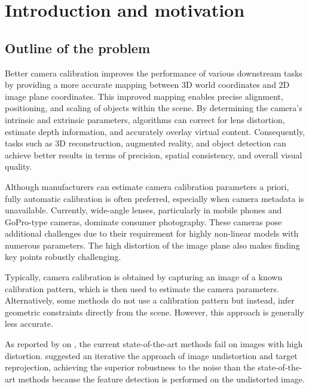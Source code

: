 \chapter{Introduction and motivation}\label{cha:introduction_and_motivation}

\section{Outline of the problem}\label{sec:outline_of_the_problem}

Better camera calibration improves the performance of various downstream tasks
by providing a more accurate mapping between 3D world coordinates and 2D image
plane coordinates. This improved mapping enables precise alignment, positioning,
and scaling of objects within the scene. By determining the camera's intrinsic
and extrinsic parameters, algorithms can correct for lens distortion, estimate
depth information, and accurately overlay virtual content. Consequently, tasks
such as 3D reconstruction, augmented reality, and object detection can achieve
better results in terms of precision, spatial consistency, and overall visual
quality.

Although manufacturers can estimate camera calibration parameters a priori,
fully automatic calibration is often preferred, especially when camera metadata
is unavailable. Currently, wide-angle lenses, particularly in mobile phones and
GoPro-type cameras, dominate consumer photography. These cameras pose additional
challenges due to their requirement for highly non-linear models with numerous
parameters. The high distortion of the image plane also makes finding key points
robustly challenging.

Typically, camera calibration is obtained by capturing an image of a known
calibration pattern, which is then used to estimate the camera parameters.
Alternatively, some methods do not use a calibration pattern but instead, infer
geometric constraints directly from the scene. However, this approach is
generally less accurate.

As reported by \textcite{duisterhofTartanCalibIterativeWideAngle2022} on
, the current state-of-the-art
methods
\citep{olsonAprilTagRobustFlexible2011, schopsWhyHaving102020,
	krogiusFlexibleLayoutsFiducial2019}
fail on images with high distortion.
\cite{duisterhofTartanCalibIterativeWideAngle2022} suggested an iterative
the approach of image undistortion and target reprojection, achieving the superior
robustness to the noise than the state-of-the-art methods because the feature
detection is performed on the undistorted image.

